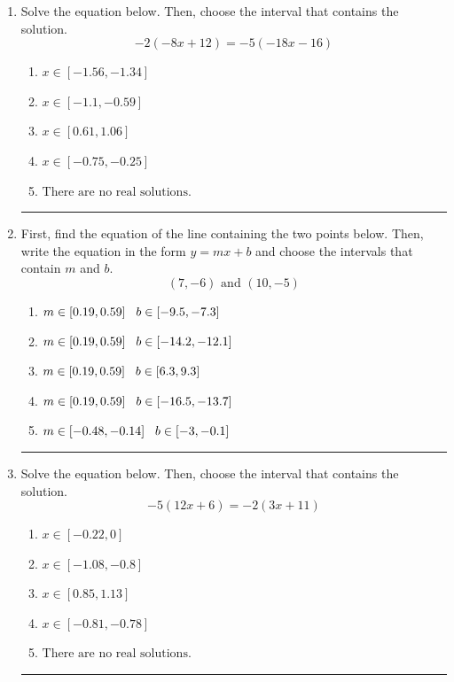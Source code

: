 \documentclass[14pt]{extbook}
\newcommand{\litem}[1]{\item#1\hspace*{-1cm}\rule{\textwidth}{0.4pt}}
\begin{document}
\begin{enumerate}
{\begin{enumerate}[label=\Alph*.]
\end{enumerate} }
\litem{
Solve the equation below. Then, choose the interval that contains the solution.\[ -2(-8x + 12) = -5(-18x -16) \]\begin{enumerate}[label=\Alph*.]
\item \( x \in [-1.56, -1.34] \)
\item \( x \in [-1.1, -0.59] \)
\item \( x \in [0.61, 1.06] \)
\item \( x \in [-0.75, -0.25] \)
\item \( \text{There are no real solutions.} \)

\end{enumerate} }
\litem{
First, find the equation of the line containing the two points below. Then, write the equation in the form $ y=mx+b $ and choose the intervals that contain $m$ and $b$.\[ (7, -6) \text{ and } (10, -5) \]\begin{enumerate}[label=\Alph*.]
\item \( m \in [0.19, 0.59] \hspace*{3mm} b \in [-9.5, -7.3] \)
\item \( m \in [0.19, 0.59] \hspace*{3mm} b \in [-14.2, -12.1] \)
\item \( m \in [0.19, 0.59] \hspace*{3mm} b \in [6.3, 9.3] \)
\item \( m \in [0.19, 0.59] \hspace*{3mm} b \in [-16.5, -13.7] \)
\item \( m \in [-0.48, -0.14] \hspace*{3mm} b \in [-3, -0.1] \)

\end{enumerate} }
\litem{
Solve the equation below. Then, choose the interval that contains the solution.\[ -5(12x + 6) = -2(3x + 11) \]\begin{enumerate}[label=\Alph*.]
\item \( x \in [-0.22, 0] \)
\item \( x \in [-1.08, -0.8] \)
\item \( x \in [0.85, 1.13] \)
\item \( x \in [-0.81, -0.78] \)
\item \( \text{There are no real solutions.} \)

\end{enumerate} }
\end{enumerate}
\end{document}

